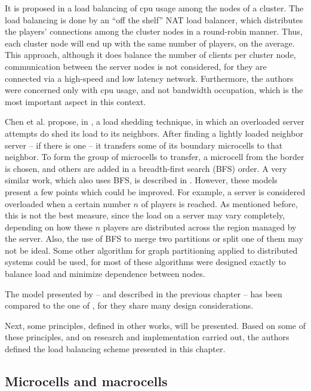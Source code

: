 It is proposed in \cite{lu2006lbm} a load balancing of cpu usage among the nodes of a cluster. The load balancing is done by an ``off the shelf'' NAT load balancer, which distributes the players' connections among the cluster nodes in a round-robin manner. Thus, each cluster node will end up with the same number of players, on the average. This approach, although it does balance the number of clients per cluster node, communication between the server nodes is not considered, for they are connected via a high-speed and low latency network. Furthermore, the authors were concerned only with cpu usage, and not bandwidth occupation, which is the most important aspect in this context.

Chen et al. propose, in \cite{chen2005lad}, a load shedding technique, in which an overloaded server attempts do shed its load to its neighbors. After finding a lightly loaded neighbor server -- if there is one -- it transfers some of its boundary microcells to that neighbor. To form the group of microcells to transfer, a microcell from the border is chosen, and others are added in a breadth-first search (BFS) order. A very similar work, which also uses BFS, is described in \cite{duong2003dls}. However, these models present a few points which could be improved. For example, a server is considered overloaded when a certain number $n$ of players is reached. As mentioned before, this is not the best measure, since the load on a server may vary completely, depending on how these $n$ players are distributed across the region managed by the server. Also, the use of BFS to merge two partitions or split one of them may not be ideal. Some other algorithm for graph partitioning applied to distributed systems \cite{kernighan1970ehp,fiduccia1982lth,karypis1999fah,hendrickson1995isg} could be used, for most of these algorithms were designed exactly to balance load and minimize dependence between nodes.

The model presented by \cite{ahmed2008mol} -- and described in the previous chapter -- has been compared to the one of \cite{bezerra2009lbs}, for they share many design considerations.

Next, some principles, defined in other works, will be presented. Based on some of these principles, and on research and implementation carried out, the authors defined the load balancing scheme presented in this chapter.

\subsection{Microcells and macrocells}
\label{sec:micro}

